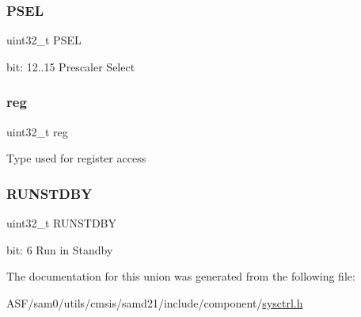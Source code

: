 \subsubsection{\texorpdfstring{PSEL}{PSEL}}
{\footnotesize\ttfamily uint32\+\_\+t P\+S\+EL}

bit\+: 12..15 Prescaler Select \mbox{\label{union_s_y_s_c_t_r_l___b_o_d33___type_a6b91636401516a477989a336376d7b40}} 
\subsubsection{\texorpdfstring{reg}{reg}}
{\footnotesize\ttfamily uint32\+\_\+t reg}

Type used for register access \mbox{\label{union_s_y_s_c_t_r_l___b_o_d33___type_a5656560aef3eaf5aac89b68b9fe39c3a}} 
\subsubsection{\texorpdfstring{RUNSTDBY}{RUNSTDBY}}
{\footnotesize\ttfamily uint32\+\_\+t R\+U\+N\+S\+T\+D\+BY}

bit\+: 6 Run in Standby 

The documentation for this union was generated from the following file\+:\begin{DoxyCompactItemize}
\item 
A\+S\+F/sam0/utils/cmsis/samd21/include/component/\mbox{\hyperlink{component_2sysctrl_8h}{sysctrl.\+h}}\end{DoxyCompactItemize}
